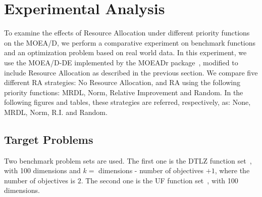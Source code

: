 \section{Experimental Analysis}

%

To examine the effects of Resource Allocation under different priority functions on the MOEA/D, we perform a comparative experiment on benchmark functions and an optimization problem based on real world data.
In this experiment, we use the MOEA/D-DE implemented by the MOEADr package~\cite{moeadr_package}, modified to include Resource Allocation as described in the previous section. We compare five different RA strategies: No Resource Allocation, and RA using the following priority functions: MRDL, Norm, Relative Improvement and Random. In the following figures and tables, these strategies are referred, respectively, as: None, MRDL, Norm, R.I. and Random.

\subsection{Target Problems}

Two benchmark problem sets are used. The first one is the DTLZ function set~\cite{deb2005scalable}, with 100 dimensions and $k =$ dimensions - number of objectives $+ 1$, where the number of objectives is $2$. The second one is the UF function set~\cite{zhang2008multiobjective}, with 100 dimensions.

